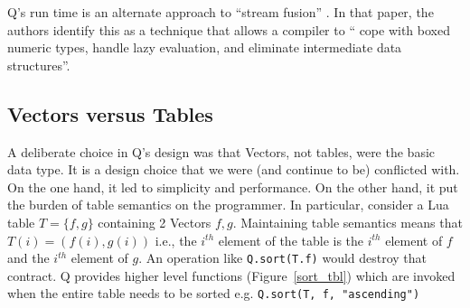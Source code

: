 Q's run time is an alternate approach to ``stream fusion''
\cite{Mainland2017}. In
that paper, the authors identify this as a technique that allows a compiler to
`` cope with boxed numeric types, handle lazy evaluation, and
eliminate intermediate data structures''.
\subsection{Vectors versus Tables}
\label{vectors_versus_tables}

A deliberate choice in Q's design was that Vectors, not tables, were the basic
data type. It is a design choice that we were (and continue to be) conflicted with. On the one hand,
it led to simplicity and performance. On the other hand, it put the burden of
table semantics on the programmer. In particular, consider a 
Lua table \(T = \{f, g\}\) containing 2 Vectors \(f, g\). Maintaining table
semantics means that \(T(i) = (f(i), g(i))\)  i.e., the \(i^{th}\) element of
the table is the \(i^{th}\) element of \(f\) and the \(i^{th}\) element of \(g\). An 
operation like {\tt Q.sort(T.f)} would destroy that contract. Q
provides higher level functions (Figure~\ref{sort_tbl}) which are invoked when the entire table needs to
be sorted e.g. {\tt Q.sort(T, f, "ascending")} 

\begin{figure}[hbtp]
\centering
{}
\end{figure}
